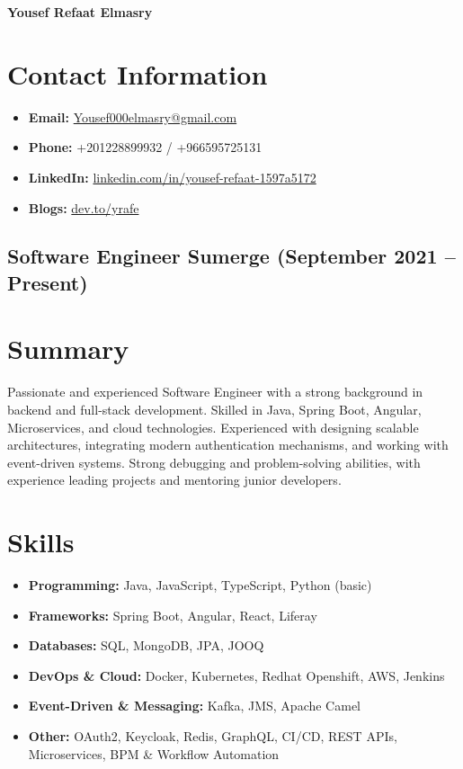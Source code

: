 \documentclass[a4paper,11pt]{article}
\begin{document}
\begin{center}
    {\LARGE \textbf{Yousef Refaat Elmasry}}\\
\end{center}

\section*{Contact Information}
\begin{itemize}
    \item \textbf{Email:} \href{mailto:Yousef000elmasry@gmail.com}{Yousef000elmasry@gmail.com}
    \item \textbf{Phone:} +201228899932 / +966595725131
    \item \textbf{LinkedIn:} \href{https://www.linkedin.com/in/yousef-refaat-1597a5172}{linkedin.com/in/yousef-refaat-1597a5172}
    \item \textbf{Blogs:} \href{https://dev.to/yrafe}{dev.to/yrafe}
\end{itemize}
\subsection*{Software Engineer \textbar{} Sumerge (September 2021 – Present)}


\section*{Summary}
Passionate and experienced Software Engineer with a strong background in backend and full-stack development. Skilled in Java, Spring Boot, Angular, Microservices, and cloud technologies. Experienced with designing scalable architectures, integrating modern authentication mechanisms, and working with event-driven systems. Strong debugging and problem-solving abilities, with experience leading projects and mentoring junior developers.

\section*{Skills}
\begin{itemize}
    \item \textbf{Programming:} Java, JavaScript, TypeScript, Python (basic)
    \item \textbf{Frameworks:} Spring Boot, Angular, React, Liferay
    \item \textbf{Databases:} SQL, MongoDB, JPA, JOOQ
    \item \textbf{DevOps \& Cloud:} Docker, Kubernetes, Redhat Openshift, AWS, Jenkins
    \item \textbf{Event-Driven \& Messaging:} Kafka, JMS, Apache Camel
    \item \textbf{Other:} OAuth2, Keycloak, Redis, GraphQL, CI/CD, REST APIs, Microservices, BPM \& Workflow Automation
\end{itemize}
\end{document}
